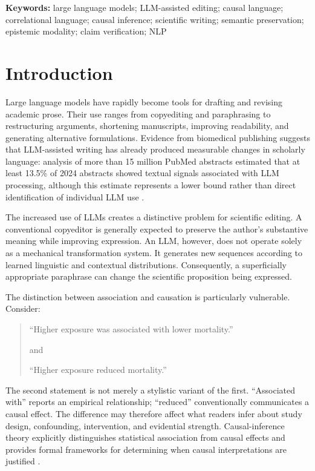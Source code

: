 \documentclass[11pt]{article}
\begin{document}
\noindent\textbf{Keywords:} large language models; LLM-assisted editing; causal language; correlational language; causal inference; scientific writing; semantic preservation; epistemic modality; claim verification; NLP

\section{Introduction}
\label{sec:introduction}
Large language models have rapidly become tools for drafting and revising academic prose. Their use ranges from copyediting and paraphrasing to restructuring arguments, shortening manuscripts, improving readability, and generating alternative formulations. Evidence from biomedical publishing suggests that LLM-assisted writing has already produced measurable changes in scholarly language: analysis of more than 15 million PubMed abstracts estimated that at least 13.5\% of 2024 abstracts showed textual signals associated with LLM processing, although this estimate represents a lower bound rather than direct identification of individual LLM use \cite{kobak2025}.

The increased use of LLMs creates a distinctive problem for scientific editing. A conventional copyeditor is generally expected to preserve the author's substantive meaning while improving expression. An LLM, however, does not operate solely as a mechanical transformation system. It generates new sequences according to learned linguistic and contextual distributions. Consequently, a superficially appropriate paraphrase can change the scientific proposition being expressed.

The distinction between association and causation is particularly vulnerable. Consider:

\begin{quote}
``Higher exposure was associated with lower mortality.''

and

``Higher exposure reduced mortality.''
\end{quote}

The second statement is not merely a stylistic variant of the first. ``Associated with'' reports an empirical relationship; ``reduced'' conventionally communicates a causal effect. The difference may therefore affect what readers infer about study design, confounding, intervention, and evidential strength. Causal-inference theory explicitly distinguishes statistical association from causal effects and provides formal frameworks for determining when causal interpretations are justified \cite{rubin1974,pearl2009}.
\end{document}
